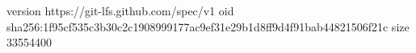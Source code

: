 version https://git-lfs.github.com/spec/v1
oid sha256:1f95cf535c3b30c2c1908999177ac9ef31e29b1d8ff9d4f91bab44821506f21c
size 33554400
